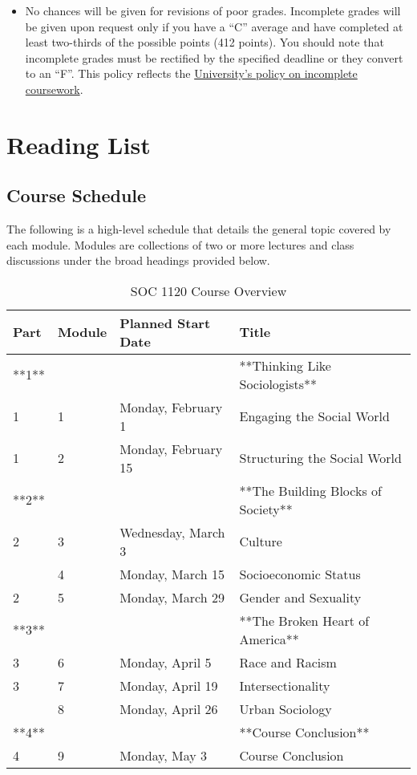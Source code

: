 \documentclass[
]{book}
\newenvironment{rmdblock}[1]
  {\begin{shaded*}
  \begin{itemize}
  \renewcommand{\labelitemi}{
    \raisebox{-.7\height}[0pt][0pt]{
      {\setkeys{Gin}{width=3em,keepaspectratio}\texttt{[image: images/\#1]}}
    }
  }
  \item
  }
  {
  \end{itemize}
  \end{shaded*}
  }
\newenvironment{rmdwarning}
  {\begin{rmdblock}{warning}}
  {\end{rmdblock}}
\begin{document}
\begin{rmdwarning}
No chances will be given for revisions of poor grades. Incomplete grades
will be given upon request only if you have a ``C'' average and have
completed at least two-thirds of the possible points (412 points). You
should note that incomplete grades must be rectified by the specified
deadline or they convert to an ``F''. This policy reflects the
\href{https://catalog.slu.edu/academic-policies/academic-policies-procedures/incomplete-course/}{University's
policy on incomplete coursework}.
\end{rmdwarning}

\hypertarget{part-reading-list}{%
\part{Reading List}\label{part-reading-list}}

\hypertarget{course-schedule}{%
\chapter{Course Schedule}\label{course-schedule}}

The following is a high-level schedule that details the general topic covered by each module. Modules are collections of two or more lectures and class discussions under the broad headings provided below.

\begin{table}

\caption{\label{tab:unnamed-chunk-2}SOC 1120 Course Overview}
\centering
\begin{tabular}[t]{llll}
\toprule
Part & Module & Planned Start Date & Title\\
\midrule
**1** &  &  & **Thinking Like Sociologists**\\
1 & 1 & Monday, February 1 & Engaging the Social World\\
1 & 2 & Monday, February 15 & Structuring the Social World\\
**2** &  &  & **The Building Blocks of Society**\\
2 & 3 & Wednesday, March 3 & Culture\\
\addlinespace
2 & 4 & Monday, March 15 & Socioeconomic Status\\
2 & 5 & Monday, March 29 & Gender and Sexuality\\
**3** &  &  & **The Broken Heart of America**\\
3 & 6 & Monday, April 5 & Race and Racism\\
3 & 7 & Monday, April 19 & Intersectionality\\
\addlinespace
3 & 8 & Monday, April 26 & Urban Sociology\\
**4** &  &  & **Course Conclusion**\\
4 & 9 & Monday, May 3 & Course Conclusion\\
\bottomrule
\end{tabular}
\end{table}
\end{document}
